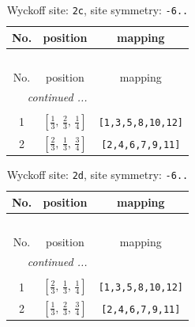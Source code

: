 \documentclass[fleqn,8pt]{jsarticle}
\begin{document}
\begin{longtable}{ccc}
\caption{Wyckoff site: {\tt 2c}, site symmetry: {\tt -6..}}
 \\
 \hline \hline
No. & position & mapping \\ \hline \endfirsthead

\multicolumn{2}{l}{\tablename\ \thetable{}} \\
 \hline \hline
No. & position & mapping \\ \hline \endhead

 \hline \hline
\multicolumn{2}{r}{\footnotesize\it continued ...} \\ \endfoot

 \hline \hline
\multicolumn{2}{r}{} \\ \endlastfoot

1 & $\left[ \frac{1}{3},\, \frac{2}{3},\, \frac{1}{4} \right]$ & {\tt [1,3,5,8,10,12]} \\ \hline
2 & $\left[ \frac{2}{3},\, \frac{1}{3},\, \frac{3}{4} \right]$ & {\tt [2,4,6,7,9,11]} \\
\end{longtable}
\renewcommand{\arraystretch}{1.2}
\begin{longtable}{ccc}
\caption{Wyckoff site: {\tt 2d}, site symmetry: {\tt -6..}}
 \\
 \hline \hline
No. & position & mapping \\ \hline \endfirsthead

\multicolumn{2}{l}{\tablename\ \thetable{}} \\
 \hline \hline
No. & position & mapping \\ \hline \endhead

 \hline \hline
\multicolumn{2}{r}{\footnotesize\it continued ...} \\ \endfoot

 \hline \hline
\multicolumn{2}{r}{} \\ \endlastfoot

1 & $\left[ \frac{2}{3},\, \frac{1}{3},\, \frac{1}{4} \right]$ & {\tt [1,3,5,8,10,12]} \\ \hline
2 & $\left[ \frac{1}{3},\, \frac{2}{3},\, \frac{3}{4} \right]$ & {\tt [2,4,6,7,9,11]} \\
\end{longtable}
\renewcommand{\arraystretch}{1.2}
\end{document}
